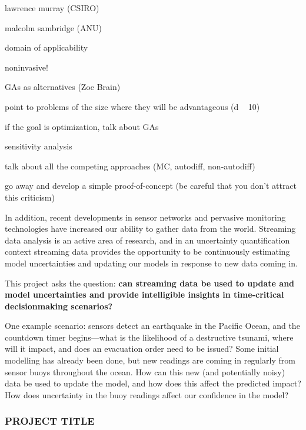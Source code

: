 \documentclass[a4paper,fontsize=12pt]{scrartcl}
\begin{document}
\printbibliography[title=References]

\appendix
\newpage


lawrence murray (CSIRO)

malcolm sambridge (ANU)

domain of applicability

noninvasive!

GAs as alternatives (Zoe Brain)

point to problems of the size where they will be advantageous (d ~ 10)

if the goal is optimization, talk about GAs

sensitivity analysis

talk about all the competing approaches (MC, autodiff, non-autodiff)

go away and develop a simple proof-of-concept (be careful that you
don't attract this criticism)






In addition, recent developments in sensor networks and pervasive
monitoring technologies have increased our ability to gather data from
the world. Streaming data analysis is an active area of research, and
in an uncertainty quantification context streaming data provides the
opportunity to be continuously estimating model uncertainties and
updating our models in response to new data coming in.

This project asks the question: \textbf{can streaming data be used to
  update and model uncertainties and provide intelligible insights in
  time-critical decisionmaking scenarios?}

One example scenario: sensors detect an earthquake in the Pacific Ocean,
and the countdown timer begins---what is the likelihood of a
destructive tsunami, where will it impact, and does an evacuation
order need to be issued? Some initial modelling has already been done,
but new readings are coming in regularly from sensor buoys throughout
the ocean. How can this new (and potentially noisy) data be used to
update the model, and how does this affect the predicted impact? How
does uncertainty in the buoy readings affect our confidence in the
model?






\subsubsection*{PROJECT TITLE}
\end{document}
